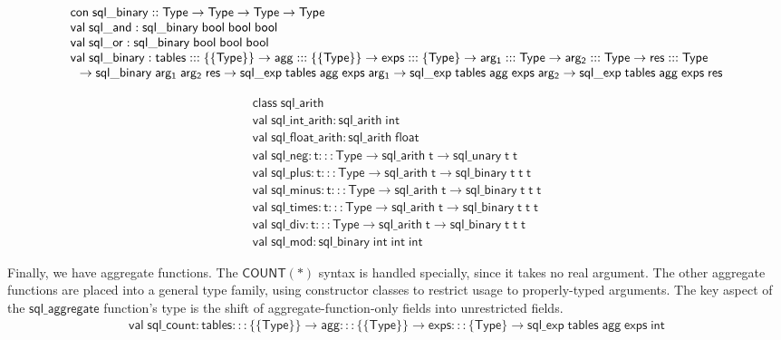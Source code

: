 \documentclass{article}
\newcommand{\mt}[1]{\mathsf{#1}}
\begin{document}
$$\begin{array}{l}
  \mt{con} \; \mt{sql\_binary} :: \mt{Type} \to \mt{Type} \to \mt{Type} \to \mt{Type} \\
  \mt{val} \; \mt{sql\_and} : \mt{sql\_binary} \; \mt{bool} \; \mt{bool} \; \mt{bool} \\
  \mt{val} \; \mt{sql\_or} : \mt{sql\_binary} \; \mt{bool} \; \mt{bool} \; \mt{bool} \\
  \mt{val} \; \mt{sql\_binary} : \mt{tables} ::: \{\{\mt{Type}\}\} \to \mt{agg} ::: \{\{\mt{Type}\}\} \to \mt{exps} ::: \{\mt{Type}\} \to \mt{arg_1} ::: \mt{Type} \to \mt{arg_2} ::: \mt{Type} \to \mt{res} ::: \mt{Type} \\
  \hspace{.1in} \to \mt{sql\_binary} \; \mt{arg_1} \; \mt{arg_2} \; \mt{res} \to \mt{sql\_exp} \; \mt{tables} \; \mt{agg} \; \mt{exps} \; \mt{arg_1} \to \mt{sql\_exp} \; \mt{tables} \; \mt{agg} \; \mt{exps} \; \mt{arg_2} \to \mt{sql\_exp} \; \mt{tables} \; \mt{agg} \; \mt{exps} \; \mt{res}
\end{array}$$

$$\begin{array}{l}
  \mt{class} \; \mt{sql\_arith} \\
  \mt{val} \; \mt{sql\_int\_arith} : \mt{sql\_arith} \; \mt{int} \\
  \mt{val} \; \mt{sql\_float\_arith} : \mt{sql\_arith} \; \mt{float} \\
  \mt{val} \; \mt{sql\_neg} : \mt{t} ::: \mt{Type} \to \mt{sql\_arith} \; \mt{t} \to \mt{sql\_unary} \; \mt{t} \; \mt{t} \\
  \mt{val} \; \mt{sql\_plus} : \mt{t} ::: \mt{Type} \to \mt{sql\_arith} \; \mt{t} \to \mt{sql\_binary} \; \mt{t} \; \mt{t} \; \mt{t} \\
  \mt{val} \; \mt{sql\_minus} : \mt{t} ::: \mt{Type} \to \mt{sql\_arith} \; \mt{t} \to \mt{sql\_binary} \; \mt{t} \; \mt{t} \; \mt{t} \\
  \mt{val} \; \mt{sql\_times} : \mt{t} ::: \mt{Type} \to \mt{sql\_arith} \; \mt{t} \to \mt{sql\_binary} \; \mt{t} \; \mt{t} \; \mt{t} \\
  \mt{val} \; \mt{sql\_div} : \mt{t} ::: \mt{Type} \to \mt{sql\_arith} \; \mt{t} \to \mt{sql\_binary} \; \mt{t} \; \mt{t} \; \mt{t} \\
  \mt{val} \; \mt{sql\_mod} : \mt{sql\_binary} \; \mt{int} \; \mt{int} \; \mt{int}
\end{array}$$

Finally, we have aggregate functions.  The $\mt{COUNT(\ast)}$ syntax is handled specially, since it takes no real argument.  The other aggregate functions are placed into a general type family, using constructor classes to restrict usage to properly-typed arguments.  The key aspect of the $\mt{sql\_aggregate}$ function's type is the shift of aggregate-function-only fields into unrestricted fields.
$$\begin{array}{l}
  \mt{val} \; \mt{sql\_count} : \mt{tables} ::: \{\{\mt{Type}\}\} \to \mt{agg} ::: \{\{\mt{Type}\}\} \to \mt{exps} ::: \{\mt{Type}\} \to \mt{sql\_exp} \; \mt{tables} \; \mt{agg} \; \mt{exps} \; \mt{int}
\end{array}$$
\end{document}
